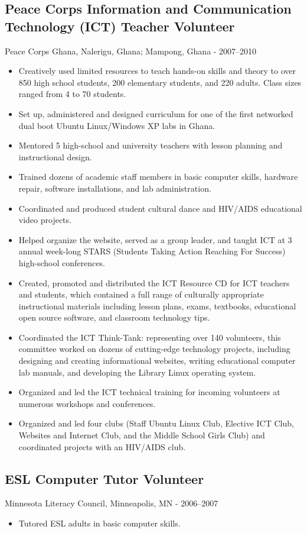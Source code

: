 \documentclass[../main.tex]{subfiles}
\begin{document}
	\subsection*{Peace Corps Information and Communication Technology (ICT) Teacher Volunteer}
     Peace Corps Ghana, Nalerigu, Ghana; Mampong, Ghana - 2007--2010
	\begin{itemize}
		\item{Creatively used limited resources to teach hands-on skills and theory to over 850 high school students, 200 elementary students, and 220 adults. Class sizes ranged from 4 to 70 students.}
		\item{Set up, administered and designed curriculum for one of the first networked dual boot Ubuntu Linux/Windows XP labs in Ghana. }
		\item{Mentored 5 high-school and university teachers with lesson planning and instructional design. }
		\item{Trained dozens of academic staff members in basic computer skills, hardware repair, software installations, and lab administration.}
		\item{Coordinated and produced student cultural dance and HIV/AIDS educational video projects.}
		\item{Helped organize the website, served as a group leader, and taught ICT at 3 annual week-long STARS (Students Taking Action Reaching For Success) high-school conferences.}
		\item{Created, promoted and distributed the ICT Resource CD for ICT teachers and students, which contained a full range of culturally appropriate instructional materials including lesson plans, exams, textbooks, educational open source software, and classroom technology tips.}
		\item{Coordinated the ICT Think-Tank: representing over 140 volunteers, this committee worked on dozens of cutting-edge technology projects, including designing and creating informational websites, writing educational computer lab manuals, and developing the Library Linux operating system. }
		\item{Organized and led the ICT technical training for incoming volunteers at numerous workshops and conferences.}
		\item{Organized and led four clubs (Staff Ubuntu Linux Club, Elective ICT Club, Websites and Internet Club, and the Middle School Girls Club) and coordinated projects with an HIV/AIDS club. }
	\end{itemize}

	\subsection*{ESL Computer Tutor Volunteer}
     Minnesota Literacy Council, Minneapolis, MN - 2006--2007
	\begin{itemize}
		\item{Tutored ESL adults in basic computer skills.}
	\end{itemize}
\end{document}
